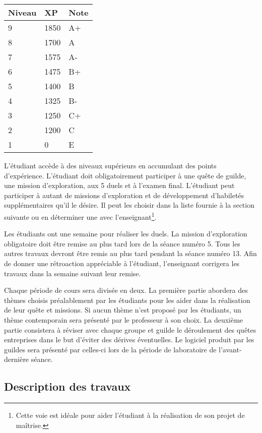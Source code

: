 \documentclass{article}
\begin{document}
\begin{center}
\begin{tabular}{|l|l|l|}
\hline
\textbf{Niveau} & \textbf{XP} & \textbf{Note}\\
\hline
9 & 1850 & A+ \\
\hline
8 & 1700 & A \\
\hline
7 & 1575 & A- \\
\hline
6 & 1475 & B+ \\
\hline
5 & 1400 & B \\
\hline
4 & 1325 & B- \\
\hline
3 & 1250 & C+ \\
\hline
2 & 1200 & C \\
\hline
1 & 0 & E \\
\hline
\end{tabular}
\end{center}

L'étudiant accède à des niveaux supérieurs en accumulant des points d'expérience. L'étudiant doit obligatoirement participer à une quête de guilde, une mission d'exploration, aux 5 duels et à l'examen final. L'étudiant peut participer à autant de missions d'exploration et de développement d'habiletés supplémentaires qu'il le désire. Il peut les choisir dans la liste fournie à la section suivante ou en déterminer une avec l'enseignant\footnote{Cette voie est idéale pour aider l'étudiant à la réalisation de son projet de maîtrise.}.

Les étudiants ont une semaine pour réaliser les duels. La mission d'exploration obligatoire doit être remise au plus tard lors de la séance numéro 5. Tous les autres travaux devront être remis au plus tard pendant la séance numéro 13. Afin de donner une rétroaction appréciable à l'étudiant, l'enseignant corrigera les travaux dans la semaine suivant leur remise.

Chaque période de cours sera divisée en deux. La première partie abordera des thèmes choisis préalablement par les étudiants pour les aider dans la réalisation de leur quête et missions. Si aucun thème n'est proposé par les étudiants, un thème contemporain sera présenté par le professeur à son choix. La deuxième partie consistera à réviser avec chaque groupe et guilde le déroulement des quêtes entreprises dans le but d'éviter des dérives éventuelles. Le logiciel produit par les guildes sera présenté par celles-ci lors de la période de laboratoire de l'avant-dernière séance.

\subsection{Description des travaux}
\label{sub:description_des_travaux}
\end{document}
